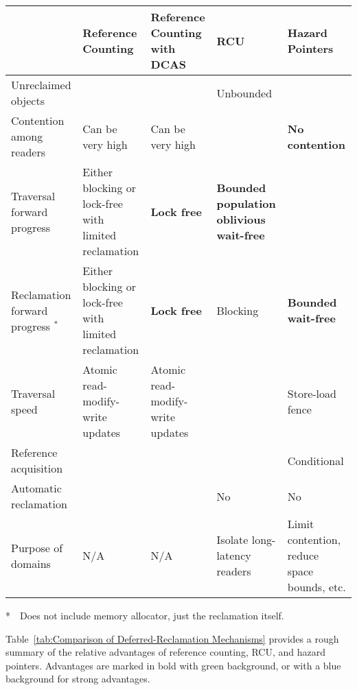 \documentclass[letterpaper,10pt]{article}
\begin{document}
\begin{sidewaystable*}
\small
\centering
\begin{tabular}{p{1.2in}|p{1.2in}|p{1.2in}|p{1.2in}|p{1.2in}}
	& Reference Counting
		& \raggedright Reference Counting with DCAS
			& RCU
				& Hazard Pointers \\
	\hline
	\hline
	Unreclaimed objects
		& \cellcolor{green!30}{\bf Bounded}
			& \cellcolor{green!30}{\bf Bounded}
				& Unbounded
					& \cellcolor{green!30}{\bf Bounded} \\
	\hline
	\raggedright
	Contention among readers
		& Can be very high
			& Can be very high
				& \cellcolor{green!30}{\bf No contention}
					& \cellcolor{green!30}
					  {\bf No contention} \\
	\hline
	\raggedright
	Traversal forward progress
		& Either blocking or lock-free with limited reclamation
			& \cellcolor{green!30} {\bf Lock free}
				& \cellcolor{blue!20}
				  {\bf Bounded population oblivious wait-free}
					& \cellcolor{green!30}{\bf Lock-free} \\
	\hline
	\raggedright
	Reclamation forward progress $^*$
		& Either blocking or lock-free with limited reclamation
			& \cellcolor{green!30} {\bf Lock free}
				& Blocking
					& \cellcolor{blue!20}
					  {\bf Bounded wait-free} \\
	\hline
	Traversal speed
		& Atomic read-modify-write updates
			& Atomic read-modify-write updates
				& \cellcolor{green!30}{\bf No or low overhead}
					& Store-load fence \\
	\hline
	Reference acquisition
		& \cellcolor{green!30}{\bf Unconditional}
			& \cellcolor{green!30}{\bf Unconditional}
				& \cellcolor{green!30}{\bf Unconditional}
					& Conditional \\
	\hline
	\raggedright
	Automatic reclamation
		& \cellcolor{green!30}{\bf Yes}
			& \cellcolor{green!30}{\bf Yes}
				& No
					& No \\
	\hline
	Purpose of domains
		& N/A
			& N/A
				& Isolate long-latency readers
					& Limit contention, reduce space
					  bounds, etc.  \\
\end{tabular}
\caption{Comparison of Deferred-Reclamation Mechanisms}
\label{tab:Comparison of Deferred-Reclamation Mechanisms}

\flushleft
\noindent
*~~Does not include memory allocator, just the reclamation itself.
\end{sidewaystable*}

Table~\ref{tab:Comparison of Deferred-Reclamation Mechanisms}
provides a rough summary of the relative advantages of reference
counting, RCU, and hazard pointers.
Advantages are marked in bold with green background, or with a blue
background for strong advantages.
\end{document}

